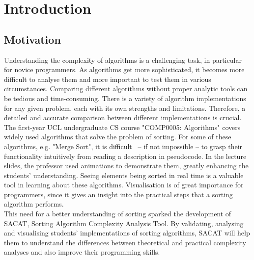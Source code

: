 \documentclass{article}
\begin{document}
    
\newpage
    \section{Introduction}
        \subsection{Motivation}
            Understanding the complexity of algorithms is a challenging task, in particular for novice programmers. As algorithms get more sophisticated, it becomes more difficult to analyse them and more important to test them in various circumstances. Comparing different algorithms without proper analytic tools can be tedious and time-consuming. There is a variety of algorithm implementations for any given problem, each with its own strengths and limitations. Therefore, a detailed and accurate comparison between different implementations is crucial.\\
            
            The first-year UCL undergraduate CS course "COMP0005: Algorithms" \cite{comp0005} covers widely used algorithms that solve the problem of sorting. For some of these algorithms, e.g. "Merge Sort", it is difficult ~– if not impossible – to grasp their functionality intuitively from reading a description in pseudocode. In the lecture slides, the professor used animations to demonstrate them, greatly enhancing the students' understanding. Seeing elements being sorted in real time is a valuable tool in learning about these algorithms. Visualisation is of great importance for programmers, since it gives an insight into the practical steps that a sorting algorithm performs.\\
            
            This need for a better understanding of sorting sparked the development of SACAT, Sorting Algorithm Complexity Analysis Tool. By validating, analysing and visualising students' implementations of sorting algorithms, SACAT will help them to understand the differences between theoretical and practical complexity analyses and also improve their programming skills.
             
\end{document}
